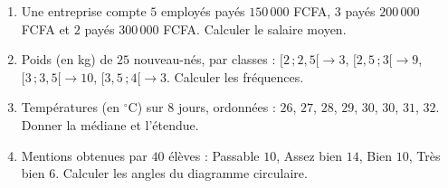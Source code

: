 \begin{enumerate}[label=\arabic*)]
\item Une entreprise compte $5$ employés payés $150\,000$ FCFA, $3$ payés $200\,000$ FCFA
et $2$ payés $300\,000$ FCFA. Calculer le salaire moyen.
\item Poids (en kg) de $25$ nouveau-nés, par classes : $[2\,;2{,}5[\to3$,
$[2{,}5\,;3[\to9$, $[3\,;3{,}5[\to10$, $[3{,}5\,;4[\to3$. Calculer les fréquences.
\item Températures (en $^{\circ}$C) sur $8$ jours, ordonnées : $26$, $27$, $28$, $29$,
$30$, $30$, $31$, $32$. Donner la médiane et l'étendue.
\item Mentions obtenues par $40$ élèves : Passable $10$, Assez bien $14$, Bien $10$, Très
bien $6$. Calculer les angles du diagramme circulaire.
\end{enumerate}

